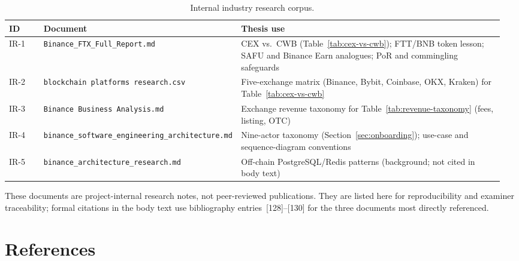 \documentclass[12pt,a4paper]{report}
\newcommand{\tableheadcolor}{\rowcolor{TableHeadBg}}
\begin{document}
\begin{table}[H]
\centering
\caption[Internal industry research corpus]{Internal industry research corpus.}
\label{tab:internal-research}
\begingroup
\footnotesize
\setlength{\tabcolsep}{4pt}
\renewcommand{\arraystretch}{1.15}
\begin{tabular}{@{}%
  >{\raggedright\arraybackslash}p{0.07\linewidth}%
  >{\raggedright\arraybackslash}p{0.36\linewidth}%
  >{\raggedright\arraybackslash}p{0.53\linewidth}@{}}
\toprule
\tableheadcolor
\textbf{ID} & \textbf{Document} & \textbf{Thesis use} \\
\midrule
IR-1 & \texttt{Binance\_FTX\_Full\_Report.md} & CEX vs.\ CWB (Table~\ref{tab:cex-vs-cwb}); FTT/BNB token lesson; SAFU and Binance Earn analogues; PoR and commingling safeguards \\
IR-2 & \texttt{blockchain platforms research.csv} & Five-exchange matrix (Binance, Bybit, Coinbase, OKX, Kraken) for Table~\ref{tab:cex-vs-cwb} \\
IR-3 & \texttt{Binance Business Analysis.md} & Exchange revenue taxonomy for Table~\ref{tab:revenue-taxonomy} (fees, listing, OTC) \\
IR-4 & \texttt{binance\_software\_engineering\_architecture.md} & Nine-actor taxonomy (Section~\ref{sec:onboarding}); use-case and sequence-diagram conventions \\
IR-5 & \texttt{binance\_architecture\_research.md} & Off-chain PostgreSQL/Redis patterns (background; not cited in body text) \\
\bottomrule
\end{tabular}
\endgroup
\end{table}

\noindent These documents are project-internal research notes, not peer-reviewed publications. They are listed here for reproducibility and examiner traceability; formal citations in the body text use bibliography entries~[128]--[130] for the three documents most directly referenced.

\chapter*{References}
{}
\end{document}
